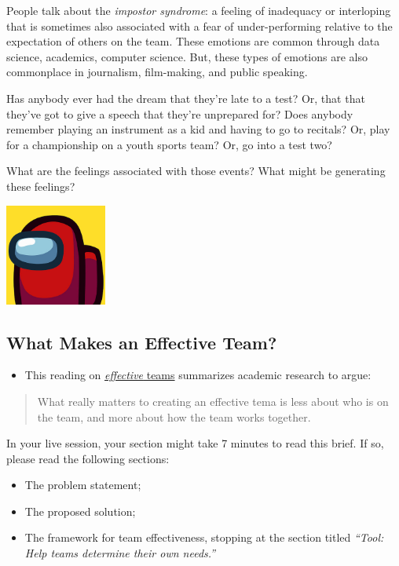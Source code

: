 \documentclass[
  letterpaper,
  DIV=11,
  numbers=noendperiod]{scrreprt}
\providecommand{\tightlist}{%
  \setlength{\itemsep}{0pt}\setlength{\parskip}{0pt}}\usepackage{longtable,booktabs,array}
\begin{document}
People talk about the \emph{impostor syndrome}: a feeling of inadequacy
or interloping that is sometimes also associated with a fear of
under-performing relative to the expectation of others on the team.
These emotions are common through data science, academics, computer
science. But, these types of emotions are also commonplace in
journalism, film-making, and public speaking.

Has anybody ever had the dream that they're late to a test? Or, that
that they've got to give a speech that they're unprepared for? Does
anybody remember playing an instrument as a kid and having to go to
recitals? Or, play for a championship on a youth sports team? Or, go
into a test two?

What are the feelings associated with those events? What might be
generating these feelings?

\includegraphics[width=0.25\textwidth,height=\textheight]{images/among_us.jpeg}

\subsection{What Makes an Effective
Team?}\label{what-makes-an-effective-team}

\begin{itemize}
\tightlist
\item
  This reading on
  \href{https://rework.withgoogle.com/print/guides/5721312655835136/}{\emph{effective}
  teams} summarizes academic research to argue:
\end{itemize}

\begin{quote}
What really matters to creating an effective tema is less about who is
on the team, and more about how the team works together.
\end{quote}

In your live session, your section might take 7 minutes to read this
brief. If so, please read the following sections:

\begin{itemize}
\tightlist
\item
  The problem statement;
\item
  The proposed solution;
\item
  The framework for team effectiveness, stopping at the section titled
  \emph{``Tool: Help teams determine their own needs.''}
\end{itemize}
\end{document}
